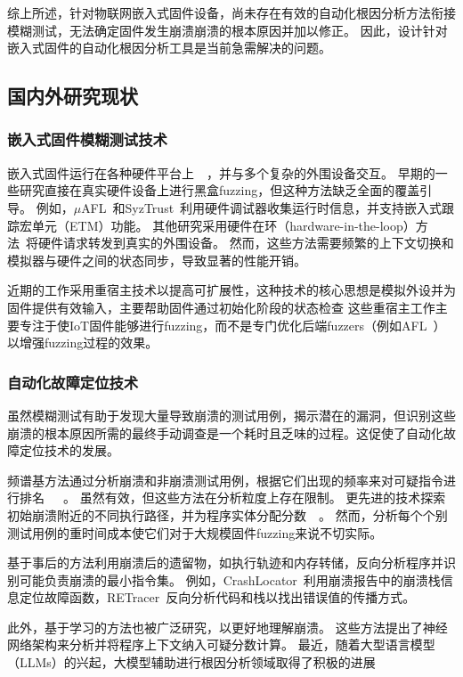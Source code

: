 综上所述，针对物联网嵌入式固件设备，尚未存在有效的自动化根因分析方法衔接模糊测试，无法确定固件发生崩溃崩溃的根本原因并加以修正。
因此，设计针对嵌入式固件的自动化根因分析工具是当前急需解决的问题。

\subsection{国内外研究现状}
\subsubsection{嵌入式固件模糊测试技术}
嵌入式固件运行在各种硬件平台上~\cite{IoTFuzzer2018}~\cite{SOBER}，并与多个复杂的外围设备交互。
早期的一些研究直接在真实硬件设备上进行黑盒fuzzing，但这种方法缺乏全面的覆盖引导。
例如，$\mu$AFL~\cite{mu2022}和SyzTrust~\cite{SyzTrust2023}利用硬件调试器收集运行时信息，并支持嵌入式跟踪宏单元（ETM\cite{Embedded2011}）功能。
其他研究采用硬件在环（hardware-in-the-loop）方法~\cite{SURROGATES}将硬件请求转发到真实的外围设备。
然而，这些方法需要频繁的上下文切换和模拟器与硬件之间的状态同步，导致显著的性能开销。

近期的工作采用重宿主技术以提高可扩展性，这种技术的核心思想是模拟外设并为固件提供有效输入，主要帮助固件通过初始化阶段的状态检查
这些重宿主工作主要专注于使IoT固件能够进行fuzzing，而不是专门优化后端fuzzers（例如AFL~\cite{AFL}）以增强fuzzing过程的效果。
\subsubsection{自动化故障定位技术}
虽然模糊测试有助于发现大量导致崩溃的测试用例，揭示潜在的漏洞，但识别这些崩溃的根本原因所需的最终手动调查是一个耗时且乏味的过程。这促使了自动化故障定位技术的发展。

频谱基方法通过分析崩溃和非崩溃测试用例，根据它们出现的频率来对可疑指令进行排名~\cite{Accuracy}~\cite{Evaluation2006}~\cite{Empirical2005}。
虽然有效，但这些方法在分析粒度上存在限制。
更先进的技术探索初始崩溃附近的不同执行路径，并为程序实体分配分数~\cite{AURORA}~\cite{Statistical2007}。
然而，分析每个个别测试用例的重时间成本使它们对于大规模固件fuzzing来说不切实际。

基于事后的方法利用崩溃后的遗留物，如执行轨迹和内存转储，反向分析程序并识别可能负责崩溃的最小指令集。
例如，CrashLocator~\cite{CrashLocator2014}利用崩溃报告中的崩溃栈信息定位故障函数，RETracer~\cite{RETracer2016}反向分析代码和栈以找出错误值的传播方式。

此外，基于学习的方法也被广泛研究，以更好地理解崩溃。
这些方法提出了神经网络架构来分析并将程序上下文纳入可疑分数计算。
最近，随着大型语言模型（LLMs）的兴起，大模型辅助进行根因分析领域取得了积极的进展~\cite{How2024}~\cite{Large2024}

